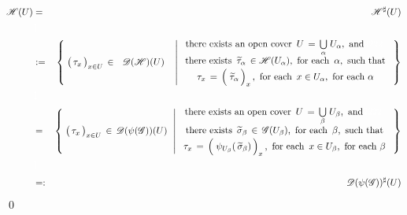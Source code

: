 \begin{eqnarray*}
\mathscr{H}(U)
& = &
	\mathscr{H}^{\sharp}(U)
\\ & {\color{white}\textnormal{\large$1$}} &
\\
& := &
	\left\{\;
		\left(\,\overset{{\color{white}.}}{\tau_{x}}\,\right)_{x \in U} \,\in\, {\color{white}1}\mathscr{D}(\mathscr{H})(U){\color{white}1}
		\;\,\left\vert\;
			\begin{array}{c}
			\textnormal{there exists an open cover \,$U \,=\, \underset{\alpha}{\bigcup}\;U_{\alpha}$,\, and{\color{white}2222.}}
			\\
			\textnormal{there exists \,$\widetilde{\tau}_{\alpha} \,\in \mathscr{H}(U_{\alpha})$,\, for each \,$\alpha$,\, such that}
			\\
			\textnormal{$\overset{{\color{white}\textnormal{\normalsize$1$}}}{\tau_{x}} \,=\, \left(\;\overset{{\color{white}.}}{\widetilde{\tau}_{\alpha}}\,\right)_{x}$\,,\, for each \,$x \in U_{\alpha}$,\, for each $\alpha$}
			\end{array}
			\right.
		\,\right\}
\\ & {\color{white}\textnormal{\large$1$}} &
\\
& = &
	\left\{\;
		\left(\,\overset{{\color{white}.}}{\tau_{x}}\,\right)_{x \in U} \,\in\, \mathscr{D}(\psi(\mathscr{G}))(U)
		\;\,\left\vert\;
			\begin{array}{c}
			\textnormal{there exists an open cover \,$U \,=\, \underset{\beta}{\bigcup}\;U_{\beta}$,\, and{\color{white}2222.}}
			\\
			\textnormal{there exists \,$\widetilde{\sigma}_{\beta} \,\in\, \mathscr{G}(U_{\beta})$,\, for each \,$\beta$,\, such that}
			\\
			\textnormal{$\overset{{\color{white}\textnormal{\normalsize$1$}}}{\tau_{x}} \,=\, \left(\;\overset{{\color{white}.}}{\psi_{U_{\beta}}(\,\widetilde{\sigma}_{\beta})}\,\right)_{x}$\,,\, for each \,$x \in U_{\beta}$,\, for each $\beta$}
			\end{array}
			\right.
		\,\right\}
\\ & {\color{white}\textnormal{\large$1$}} &
\\
& =: &
	\mathscr{D}(\psi(\mathscr{G}))^{\sharp}(U)
\end{eqnarray*}
\qed


